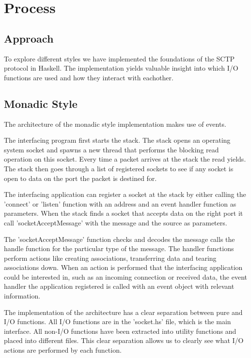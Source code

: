 \chapter{Process}
\section{Approach}
To explore different styles we have implemented the foundations of the SCTP protocol\cite{_rfc_????} in Haskell. The implementation yields valuable insight into which I/O functions are used and how they interact with eachother.
\section{Monadic Style}
The architecture of the monadic style implementation makes use of events.

The interfacing program first starts the stack. The stack opens an operating system socket and spawns a new thread that performs the blocking read operation on this socket. Every time a packet arrives at the stack the read yields. The stack then goes through a list of registered sockets to see if any socket is open to data on the port the packet is destined for.

The interfacing application can register a socket at the stack by either calling the 'connect' or 'listen' function with an address and an event handler function as parameters.
When the stack finds a socket that accepts data on the right port it call 'socketAcceptMessage' with the message and the source as parameters.

The 'socketAcceptMessage' function checks and decodes the message calls the handle function for the particular type of the message. The handler functions perform actions like creating associations, transferring data and tearing associations down. When an action is performed that the interfacing application could be interested in, such as an incoming connection or received data, the event handler the application registered is called with an event object with relevant information.

The implementation of the architecture has a clear separation between pure and I/O functions. All I/O functions are in the 'socket.hs' file, which is the main interface. All non-I/O functions have been extracted into utility functions and placed into different files. This clear separation allows us to clearly see what I/O actions are performed by each function.

